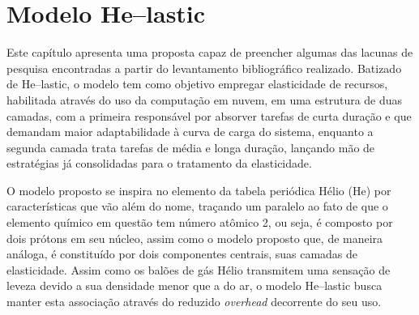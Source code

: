 \documentclass[english,brazilian]{UNISINOSmonografia} %
\begin{document}
\chapter{Modelo {H\lowercase{e}}--lastic }
\label{ch:modelo}




%





Este capítulo apresenta uma proposta capaz de preencher algumas das lacunas de pesquisa encontradas a partir do levantamento bibliográfico realizado.
Batizado de \textsf{He}--lastic, o modelo tem como objetivo empregar elasticidade de recursos, habilitada através do uso da computação em nuvem, em uma estrutura de duas camadas, com a primeira responsável por absorver tarefas de curta duração e que demandam maior adaptabilidade à curva de carga do sistema, enquanto a segunda camada trata tarefas de média e longa duração, lançando mão de estratégias já consolidadas para o tratamento da elasticidade.



O modelo proposto se inspira no elemento da tabela periódica Hélio (\textsf{He}) por características que vão além do nome, traçando um paralelo ao fato de que o elemento químico em questão tem número atômico 2, ou seja, é composto por dois prótons em seu núcleo, assim como o modelo proposto que, de maneira análoga, é constituído por dois componentes centrais, suas camadas de elasticidade.
Assim como os balões de gás Hélio transmitem uma sensação de leveza devido a sua densidade menor que a do ar, o modelo \textsf{He}--lastic busca manter esta associação através do reduzido \textit{overhead} decorrente do seu uso.
\end{document}

